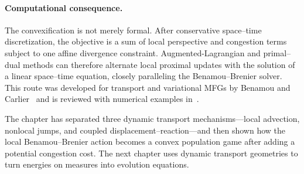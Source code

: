 \paragraph{Computational consequence.}
The convexification is not merely formal. After conservative space--time discretization, the objective is a sum of local perspective and congestion terms subject to one affine divergence constraint. Augmented-Lagrangian and primal--dual methods can therefore alternate local proximal updates with the solution of a linear space--time equation, closely paralleling the Benamou--Brenier solver. This route was developed for transport and variational MFGs by Benamou and Carlier~\cite{benamou2015augmented} and is reviewed with numerical examples in~\cite{BenamouCarlierSantambrogio2017}.

The chapter has separated three dynamic transport mechanisms---local advection, nonlocal jumps, and coupled displacement--reaction---and then shown how the local Benamou--Brenier action becomes a convex population game after adding a potential congestion cost. The next chapter uses dynamic transport geometries to turn energies on measures into evolution equations.
